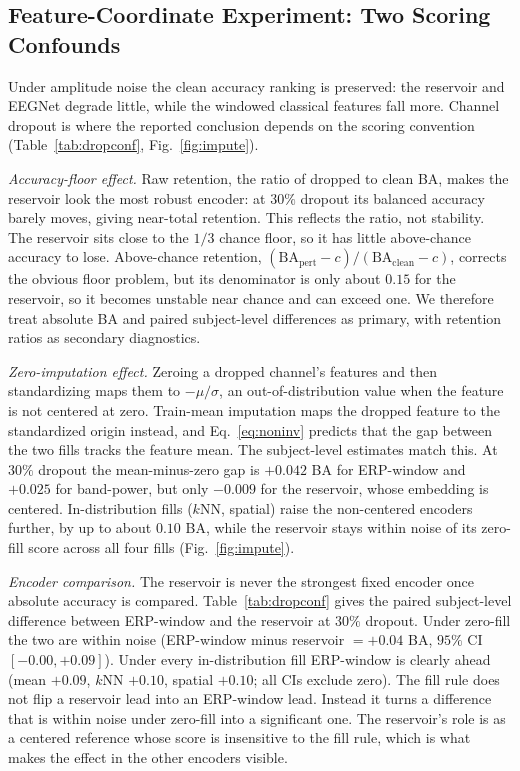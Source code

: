 \documentclass[conference]{IEEEtran}
\begin{document}
\subsection{Feature-Coordinate Experiment: Two Scoring Confounds}
\label{sec:perturb}
Under amplitude noise the clean accuracy ranking is preserved: the reservoir and EEGNet degrade little, while the windowed classical features fall more. Channel dropout is where the reported conclusion depends on the scoring convention (Table~\ref{tab:dropconf}, Fig.~\ref{fig:impute}).

\emph{Accuracy-floor effect.} Raw retention, the ratio of dropped to clean BA, makes the reservoir look the most robust encoder: at $30\%$ dropout its balanced accuracy barely moves, giving near-total retention. This reflects the ratio, not stability. The reservoir sits close to the $1/3$ chance floor, so it has little above-chance accuracy to lose. Above-chance retention, $(\mathrm{BA}_{\mathrm{pert}}-c)/(\mathrm{BA}_{\mathrm{clean}}-c)$, corrects the obvious floor problem, but its denominator is only about $0.15$ for the reservoir, so it becomes unstable near chance and can exceed one. We therefore treat absolute BA and paired subject-level differences as primary, with retention ratios as secondary diagnostics.

\emph{Zero-imputation effect.} Zeroing a dropped channel's features and then standardizing maps them to $-\mu/\sigma$, an out-of-distribution value when the feature is not centered at zero. Train-mean imputation maps the dropped feature to the standardized origin instead, and Eq.~\eqref{eq:noninv} predicts that the gap between the two fills tracks the feature mean. The subject-level estimates match this. At $30\%$ dropout the mean-minus-zero gap is $+0.042$ BA for ERP-window and $+0.025$ for band-power, but only $-0.009$ for the reservoir, whose embedding is centered. In-distribution fills ($k$NN, spatial) raise the non-centered encoders further, by up to about $0.10$ BA, while the reservoir stays within noise of its zero-fill score across all four fills (Fig.~\ref{fig:impute}).

\emph{Encoder comparison.} The reservoir is never the strongest fixed encoder once absolute accuracy is compared. Table~\ref{tab:dropconf} gives the paired subject-level difference between ERP-window and the reservoir at $30\%$ dropout. Under zero-fill the two are within noise (ERP-window minus reservoir $=+0.04$ BA, $95\%$ CI $[-0.00,+0.09]$). Under every in-distribution fill ERP-window is clearly ahead (mean $+0.09$, $k$NN $+0.10$, spatial $+0.10$; all CIs exclude zero). The fill rule does not flip a reservoir lead into an ERP-window lead. Instead it turns a difference that is within noise under zero-fill into a significant one. The reservoir's role is as a centered reference whose score is insensitive to the fill rule, which is what makes the effect in the other encoders visible.
\end{document}
